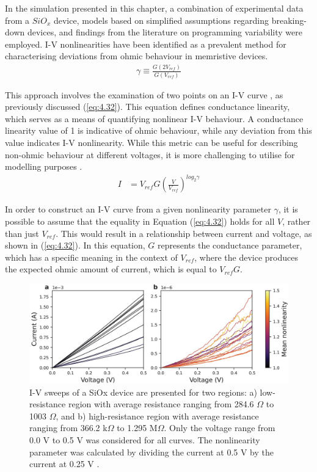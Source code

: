 In the simulation presented in this chapter, a combination of experimental data from a $SiO_x$ device, models based on simplified assumptions regarding breaking-down devices, and findings from the literature on programming variability were employed. I-V nonlinearities have been identified as a prevalent method for characterising deviations from ohmic behaviour in memristive devices.
\begin{align}
\gamma \equiv \frac{G\left( 2V_{ref} \right)}{G\left( V_{ref} \right)}  \label{eq:4.32}
\end{align}

\noindent This approach involves the examination of two points on an I-V curve \cite{lentz2013current}, as previously discussed (\ref{eq:4.32}). This equation defines conductance linearity, which serves as a means of quantifying nonlinear I-V behaviour. A conductance linearity value of 1 is indicative of ohmic behaviour, while any deviation from this value indicates I-V nonlinearity. While this metric can be useful for describing non-ohmic behaviour at different voltages, it is more challenging to utilise for modelling purposes \cite{sung2018effect}.
\begin{align}
I & = V_{ref}G\left ( \frac{V}{V_{ref}} \right )^{log_2 \gamma} \label{eq:4.33}
\end{align}

\noindent In order to construct an I-V curve from a given nonlinearity parameter $\gamma$, it is possible to assume that the equality in Equation (\ref{eq:4.32}) holds for all $V$, rather than just $V_{ref}$. This would result in a relationship between current and voltage, as shown in (\ref{eq:4.32}). In this equation, $G$ represents the conductance parameter, which has a specific meaning in the context of $V_{ref}$, where the device produces the expected ohmic amount of current, which is equal to $V_{ref} G$.\\

\begin{figure}[htbp!] 
\centering    
\includegraphics[width=1\textwidth]{Chapter4/Figs/4f.png}
\caption[I-V sweeps of a SiOx device are presented for two regions]{I-V sweeps of a SiOx device are presented for two regions: a) low-resistance region with average resistance ranging from 284.6 $\Omega$ to 1003 $\Omega$, and b) high-resistance region with average resistance ranging from 366.2 k$\Omega$ to 1.295 M$\Omega$. Only the voltage range from 0.0 V to 0.5 V was considered for all curves. The nonlinearity parameter was calculated by dividing the current at 0.5 V by the current at 0.25 V \cite{joksas2022nonideality}.}
\label{fig:4f}
\end{figure}

